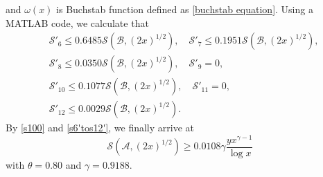 \documentclass[12pt, reqno, twoside, letterpaper]{amsart}
\numberwithin{equation}{section}
\newcommand{\cA}{\ensuremath{\mathcal{A}}}
\newcommand{\cB}{\ensuremath{\mathcal{B}}}
\newcommand{\cS}{\ensuremath{\mathcal{S}}}
\theoremstyle{customthm}
\theoremstyle{customrem}
\begin{document}
and $\omega(x)$ is Buchstab function defined as \eqref{buchstab equation}.
Using a MATLAB code, we calculate that
\begin{align}\label{s6'tos12'}
\nonumber&\cS'_6 \leqslant 0.6485\cS(\cB,(2x)^{1/2}), \quad \cS'_7 \leqslant 0.1951\cS(\cB,(2x)^{1/2}), \\
\nonumber&\cS'_8 \leqslant 0.0350\cS(\cB,(2x)^{1/2}), \quad \cS'_9 =0, \\
\nonumber&\cS'_{10} \leqslant 0.1077\cS(\cB,(2x)^{1/2}), \quad \cS'_{11} =0, \\
&\cS'_{12} \leqslant 0.0029\cS(\cB,(2x)^{1/2}).
\end{align} 
By \eqref{s100} and \eqref{s6'tos12'}, we finally arrive at
$$
\cS(\cA,(2x)^{1/2}) \geqslant 0.0108\gamma \frac{yx^{\gamma-1}}{\log x}
$$
with $\theta=0.80$ and $\gamma=0.9188$.
\end{document}
